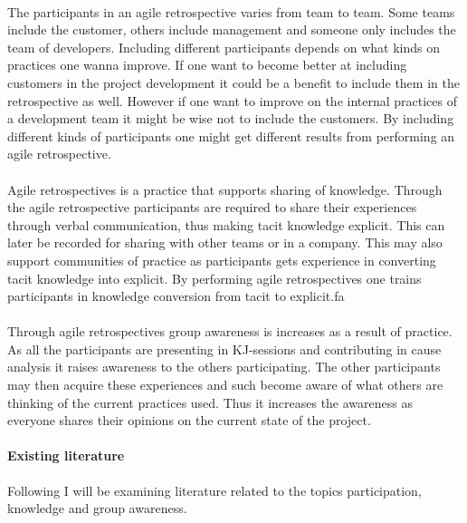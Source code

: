 \documentclass{article}
\begin{document}
\paragraph{}
The participants in an agile retrospective varies from team to team. Some teams include the customer, others include management and someone only includes the team of developers. Including different participants depends on what kinds on practices one wanna improve. If one want to become better at including customers in the project development it could be a benefit to include them in the retrospective as well. However if one want to improve on the internal practices of a development team it might be wise not to include the customers. By including different kinds of participants one might get different results from performing an agile retrospective. 

\paragraph{}
Agile retrospectives is a practice that supports sharing of knowledge. Through the agile retrospective participants are required to share their experiences through verbal communication, thus making tacit knowledge explicit. This can later be recorded for sharing with other teams or in a company. This may also support communities of practice as participants gets experience in converting tacit knowledge into explicit. By performing agile retrospectives one trains participants in knowledge conversion from tacit to explicit.fa

\paragraph{}
Through agile retrospectives group awareness is increases as a result of practice. As all the participants are presenting in KJ-sessions and contributing in cause analysis it raises awareness to the others participating. The other participants may then acquire these experiences and such become aware of what others are thinking of the current practices used. Thus it increases the awareness as everyone shares their opinions on the current state of the project.
 
\paragraph{Existing literature}
Following I will be examining literature related to the topics participation, knowledge and group awareness. 
\end{document}
